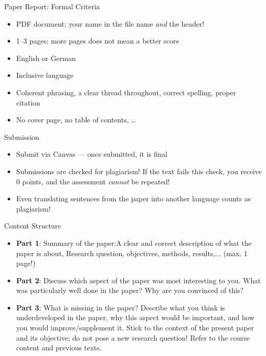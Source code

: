 \documentclass[11pt,aspectratio=169]{beamer}
\begin{document}
	\begin{frame}{Paper Report: Formal Criteria}
		\begin{itemize}
			\item PDF document; your name in the file name \emph{and} the header!
			\item 1--3 pages; more pages does not mean a better score
			\item English or German
			\item Inclusive language
			\item Coherent phrasing, a clear thread throughout, correct spelling, proper citation
			\item No cover page, no table of contents, \ldots
		\end{itemize}
	\end{frame}

	\begin{frame}{Submission}
		\begin{itemize}
			\item Submit via Canvas --- once submitted, it is final
			\item \alert{Submissions are checked for plagiarism!} If the text fails this check, you receive 0 points, and the assessment \emph{cannot} be repeated!
			\item Even translating sentences from the paper into another language counts as plagiarism!
		\end{itemize}
	\end{frame}

	\begin{frame}{Content Structure}
		\begin{itemize}
			\item \textbf{Part 1}: Summary of the paper:A clear and correct description of what the paper is about, Research question, objectives, methods, results,... (max. 1 page!)

			\item \textbf{Part 2}: Discuss which aspect of the paper was most interesting to you. What was particularly well done in the paper? Why are you convinced of this?

			\item \textbf{Part 3}: What is missing in the paper? Describe what you think is underdeveloped in the paper, why this aspect would be important, and how you would improve/supplement it. Stick to the context of the present paper and its objective; do not pose a new research question! Refer to the course content and previous texts.
		\end{itemize}

	\end{frame}
\end{document}
